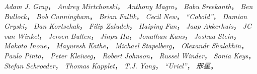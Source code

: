 \emph{Adam J. Gray}，
\emph{Andrey Mirtchovski}，
\emph{Anthony Magro}，
\emph{Babu Sreekanth}，
\emph{Ben Bullock}，
\emph{Bob Cunningham}，
\emph{Brian Fallik}，
\emph{Cecil New}，
\emph{``Cobold''}，
\emph{Damian Gryski}，
\emph{Dan Kortschak}，
\emph{Filip Zaludek}，
\emph{Haiping Fan}，
\emph{Jaap Akkerhuis}，
\emph{JC van Winkel}，
\emph{Jeroen Bulten}，
\emph{Jinpu Hu}，
\emph{Jonathan Kans}，
\emph{Joshua Stein}，
\emph{Makoto Inoue}，
\emph{Mayuresh Kathe}，
\emph{Michael Stapelberg}，
\emph{Olexandr Shalakhin}，
\emph{Paulo Pinto}，
\emph{Peter Kleiweg}，
\emph{Robert Johnson}，
\emph{Russel Winder}，
\emph{Sonia Keys}，
\emph{Stefan Schroeder}，
\emph{Thomas Kapplet}，
\emph{T.J. Yang}，
\emph{``Uriel''}，
\emph{邢星}。

